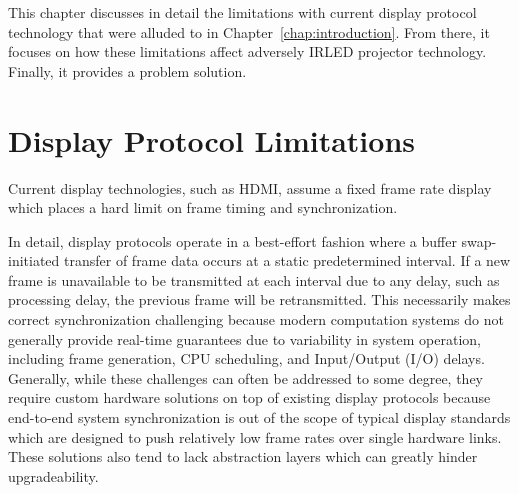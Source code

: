 \label{chap:problem_formulation}

This chapter discusses in detail the limitations with current display protocol technology that were alluded to in Chapter~\ref{chap:introduction}. From there, it focuses on how these limitations affect adversely IRLED projector technology. Finally, it provides a problem solution.

\section{Display Protocol Limitations}


    Current display technologies, such as HDMI, assume a fixed frame rate display which places a hard limit on frame timing and synchronization.

    In detail, display protocols operate in a best-effort fashion where a buffer swap-initiated transfer of frame data occurs at a static predetermined interval. If a new frame is unavailable to be transmitted at each interval due to any delay, such as processing delay, the previous frame will be retransmitted. This necessarily makes correct synchronization challenging because modern computation systems do not generally provide real-time guarantees due to variability in system operation, including frame generation, CPU scheduling, and Input/Output (I/O) delays. Generally, while these challenges can often be addressed to some degree, they require custom hardware solutions on top of existing display protocols because end-to-end system synchronization is out of the scope of typical display standards which are designed to push relatively low frame rates over single hardware links. These solutions also tend to lack abstraction layers which can greatly hinder upgradeability.

